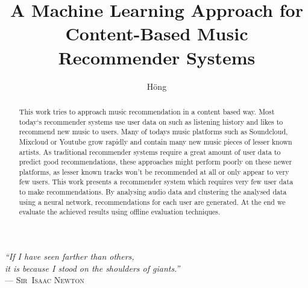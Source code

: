 \documentclass[cic,tc,english]{iiufrgs}
\title{A Machine Learning Approach for Content-Based Music Recommender Systems}
\author{H\"ong}{Alan Francisco}
\begin{document}
\maketitle

\clearpage
\begin{flushright}
     \mbox{}\vfill
     {\sffamily\itshape
       ``If I have seen farther than others,\\
       it is because I stood on the shoulders of giants.''\\}
     --- \textsc{Sir~Isaac Newton}
\end{flushright}




\begin{abstract}
    This work tries to approach music recommendation in a content based way. Most today`s recommender systems use user data on such as listening history and likes to recommend new music to users. Many of todays music platforms such as Soundcloud, Mixcloud or Youtube grow rapidly and contain many new music pieces of lesser known artists. As traditional recommender systems require a great amount of user data to predict good recommendations, these approaches might perform poorly on these newer platforms, as lesser known tracks won't be recommended at all or only appear to very few users. This work presents a recommender system which requires very few user data to make recommendations. By analysing audio data and clustering the analysed data using a neural network, recommendations for each user are generated. At the end we evaluate the achieved results using offline evaluation techniques. 
\end{abstract}

\end{document}
